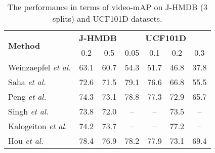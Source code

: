 \documentclass[10pt,twocolumn,letterpaper]{article}
\begin{document}
\begin{table}
\centering
\small
\caption{\small The performance in terms of video-mAP on J-HMDB (3 splits) and UCF101D datasets.}
\vspace{0.1cm}
\begin{tabular}{l@{~}|c@{~~~}c|c@{~~~}c@{~~~}c@{~~~}c} \hline
\multirow{2}{*}{\textbf{Method}}     & \multicolumn{2}{c|}{\textbf{J-HMDB}} & \multicolumn{4}{c}{\textbf{UCF101D}} \\ \cline{2-7}
                                     & 0.2 & 0.5 & 0.05 & 0.1 & 0.2 & 0.3 \\ \hline
\begin{minipage}{3cm}\vspace{0.08cm} Weinzaepfel \emph{et al.} \cite{weinzaepfel2015learning} \vspace{0.08cm}\end{minipage} & 63.1 & 60.7 & 54.3 & 51.7 & 46.8 & 37.8 \\
\begin{minipage}{3cm}\vspace{0.08cm} Saha \emph{et al.} \cite{saha2016deep} \vspace{0.08cm}\end{minipage} & 72.6 & 71.5 & 79.1 & 76.6 & 66.8 & 55.5 \\
\begin{minipage}{3cm}\vspace{0.08cm} Peng \emph{et al.} \cite{peng2016multi} \vspace{0.08cm}\end{minipage} & 74.3 & 73.1 & 78.8 & 77.3 & 72.9 & 65.7 \\
\begin{minipage}{3cm}\vspace{0.08cm} Singh \emph{et al.} \cite{singh2017online} \vspace{0.08cm}\end{minipage} & 73.8 & 72.0 & -- & -- & 73.5 & -- \\
\begin{minipage}{3cm}\vspace{0.08cm} Kalogeiton \emph{et al.} \cite{kalogeiton2017action} \vspace{0.08cm}\end{minipage} & 74.2 & 73.7 & -- & -- & 77.2 & -- \\
\begin{minipage}{3cm}\vspace{0.08cm} Hou \emph{et al.} \cite{hou2017tube} \vspace{0.08cm}\end{minipage} & 78.4 & 76.9 & 78.2 & 77.9 & 73.1 & 69.4 \\

\end{tabular}
\end{table}
\end{document}
